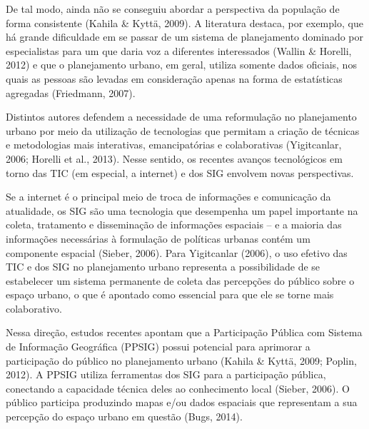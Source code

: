 \documentclass{article}
\begin{document}
De tal modo, ainda não se conseguiu abordar a perspectiva da população de forma
consistente (Kahila \& Kyttä, 2009). A
literatura destaca, por exemplo, que há grande dificuldade em se passar de um
sistema de planejamento dominado por especialistas para um que daria voz a
diferentes interessados (Wallin \& Horelli,
2012) e que o planejamento urbano, em geral, utiliza somente dados
oficiais, nos quais as pessoas são levadas em consideração apenas na forma de
estatísticas agregadas (Friedmann,
2007).

Distintos autores defendem a necessidade de uma reformulação no planejamento
urbano
por meio da utilização de tecnologias que permitam a criação de técnicas e
metodologias mais interativas, emancipatórias e colaborativas (Yigitcanlar,
2006; Horelli et
al., 2013). Nesse sentido, os recentes avanços tecnológicos em torno das
TIC (em especial, a internet) e dos SIG envolvem novas perspectivas.

Se a internet é o principal meio de troca de informações e comunicação da
atualidade,
os SIG são uma tecnologia que desempenha um papel importante na coleta,
tratamento e
disseminação de informações espaciais – e a maioria das informações necessárias
à
formulação de políticas urbanas contém um componente espacial (Sieber, 2006).
Para Yigitcanlar (2006), o uso efetivo das TIC e dos SIG no planejamento
urbano representa a possibilidade de se estabelecer um sistema permanente de
coleta
das percepções do público sobre o espaço urbano, o que é apontado como essencial
para que ele se torne mais colaborativo.

Nessa direção, estudos recentes apontam que a Participação Pública com Sistema
de
Informação Geográfica (PPSIG) possui potencial para aprimorar a participação do
público no planejamento urbano (Kahila \& Kyttä,
2009; Poplin, 2012). A PPSIG
utiliza ferramentas dos SIG para a participação pública, conectando a capacidade
técnica deles ao conhecimento local (Sieber,
2006). O público participa produzindo mapas e/ou dados espaciais que
representam a sua percepção do espaço urbano em questão (Bugs, 2014).
\end{document}
